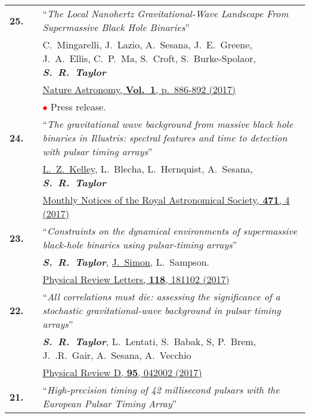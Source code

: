 \documentclass[11pt,letterpaper,sans]{moderncv}
\begin{document}
{\begin{longtable}{rp{0.3cm}p{15.8cm}}
\textbf{25.} & & ``\textit{The Local Nanohertz Gravitational-Wave Landscape From Supermassive Black Hole Binaries}'' \\ 
&&C.~Mingarelli, J.~Lazio, A.~Sesana, J.~E.~Greene, J.~A.~Ellis, C.~P.~Ma, S.~Croft, S.~Burke-Spolaor, \textit{\textbf{S.~R.~Taylor}} \\
&& \href{https://www.nature.com/articles/s41550-017-0299-6}{{\color{color1} Nature Astronomy, \textbf{Vol.~1}, p.~886-892 (2017)}} \\
&& \textcolor{red}{$\bullet$} Press release. \vspace{0.09cm}\\
\textbf{24.} & & ``\textit{The gravitational wave background from massive black hole binaries in Illustris: spectral features and time to detection with pulsar timing arrays}'' \\ 
&& \underline{L.~Z.~Kelley}, L.~Blecha, L.~Hernquist, A.~Sesana, \textit{\textbf{S.~R.~Taylor}} \\ 
&& \href{https://academic.oup.com/mnras/article/471/4/4508/3899130/The-gravitational-wave-background-from-massive}{{\color{color1} Monthly Notices of the Royal Astronomical Society, \textbf{471}, 4 (2017)}} \vspace{0.09cm}\\
\textbf{23.} & & ``\textit{Constraints on the dynamical environments of supermassive black-hole binaries using pulsar-timing arrays}'' \\ 
&& \textit{\textbf{S.~R.~Taylor}}, \underline{J.~Simon}, L.~Sampson. \\
&& \href{https://journals.aps.org/prl/abstract/10.1103/PhysRevLett.118.181102}{{\color{color1} Physical Review Letters, \textbf{118}, 181102 (2017)}} \vspace{0.09cm}\\
\textbf{22.} & & ``\textit{All correlations must die: assessing the significance of a stochastic gravitational-wave background in pulsar timing arrays}'' \\ 
&& \textit{\textbf{S.~R.~Taylor}},  L.~Lentati, S.~Babak, S, P.~Brem, J.~.R.~Gair, A.~Sesana, A.~Vecchio \\ 
&&  \href{https://journals.aps.org/prd/abstract/10.1103/PhysRevD.95.042002}{{\color{color1} Physical Review D, \textbf{95}, 042002 (2017)}} \vspace{0.09cm}\\
\textbf{21.} & & ``\textit{High-precision timing of 42 millisecond pulsars with the European Pulsar Timing Array}'' \\ 

\end{longtable}}
\end{document}
